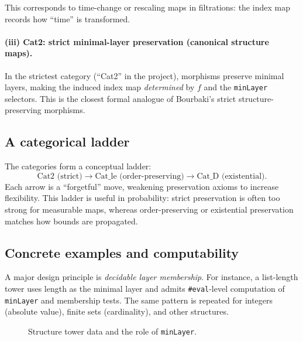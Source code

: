 \documentclass[11pt]{article}
\newcommand{\layer}{\mathsf{layer}}
\newcommand{\minLayer}{\mathsf{minLayer}}
\begin{document}
This corresponds to time-change or rescaling maps in filtrations: the index map records how ``time'' is transformed.

\paragraph{(iii) Cat2: strict minimal-layer preservation (canonical structure maps).}
In the strictest category (``Cat2'' in the project), morphisms preserve minimal layers, making the induced index map \emph{determined} by $f$ and the \texttt{minLayer} selectors. This is the closest formal analogue of Bourbaki's strict structure-preserving morphisms.

\subsection{A categorical ladder}
The categories form a conceptual ladder:
\[
\text{Cat2 (strict)} \longrightarrow \text{Cat\_le (order-preserving)} \longrightarrow \text{Cat\_D (existential)}.
\]
Each arrow is a ``forgetful'' move, weakening preservation axioms to increase flexibility. This ladder is useful in probability: strict preservation is often too strong for measurable maps, whereas order-preserving or existential preservation matches how bounds are propagated.

\subsection{Concrete examples and computability}
A major design principle is \emph{decidable layer membership}. For instance, a list-length tower uses length as the minimal layer and admits \texttt{\#eval}-level computation of \texttt{minLayer} and membership tests. The same pattern is repeated for integers (absolute value), finite sets (cardinality), and other structures.

\begin{figure}[t]
\centering
{}
\caption{Structure tower data and the role of \texttt{minLayer}.}
\label{fig:tower}
\end{figure}
\end{document}
